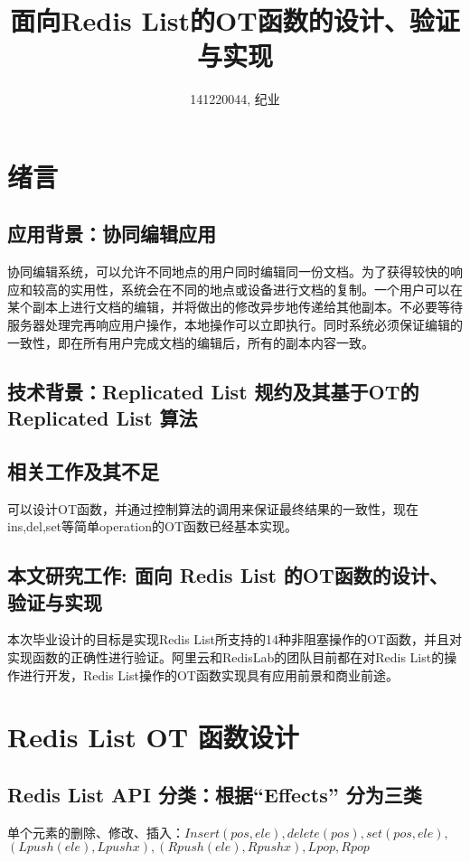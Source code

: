 \documentclass[a4paper,UTF8]{article}
\begin{document}
\title{面向Redis List的OT函数的设计、验证与实现}
\author{141220044, 纪业}
\maketitle


\section{绪言}
\subsection{应用背景：协同编辑应用}
	协同编辑系统，可以允许不同地点的用户同时编辑同一份文档。为了获得较快的响应和较高的实用性，系统会在不同的地点或设备进行文档的复制。一个用户可以在某个副本上进行文档的编辑，并将做出的修改异步地传递给其他副本。不必要等待服务器处理完再响应用户操作，本地操作可以立即执行。同时系统必须保证编辑的一致性，即在所有用户完成文档的编辑后，所有的副本内容一致。
\subsection{技术背景：Replicated List 规约及其基于OT的 Replicated List 算法}
\subsection{相关工作及其不足}
	可以设计OT函数，并通过控制算法的调用来保证最终结果的一致性，现在ins,del,set等简单operation的OT函数已经基本实现。
\subsection{本文研究工作: 面向 Redis List  的OT函数的设计、验证与实现}
	本次毕业设计的目标是实现Redis List所支持的14种非阻塞操作的OT函数，并且对实现函数的正确性进行验证。阿里云和RedisLab的团队目前都在对Redis List的操作进行开发，Redis List操作的OT函数实现具有应用前景和商业前途。
	
\section{Redis List OT 函数设计}
\subsection{Redis List API 分类：根据“Effects” 分为三类}
单个元素的删除、修改、插入：$ Insert(pos,ele),delete(pos),set(pos,ele),$\\
                      $ (Lpush(ele), Lpushx),(Rpush(ele), Rpushx),Lpop, Rpop$\\
\end{document}
